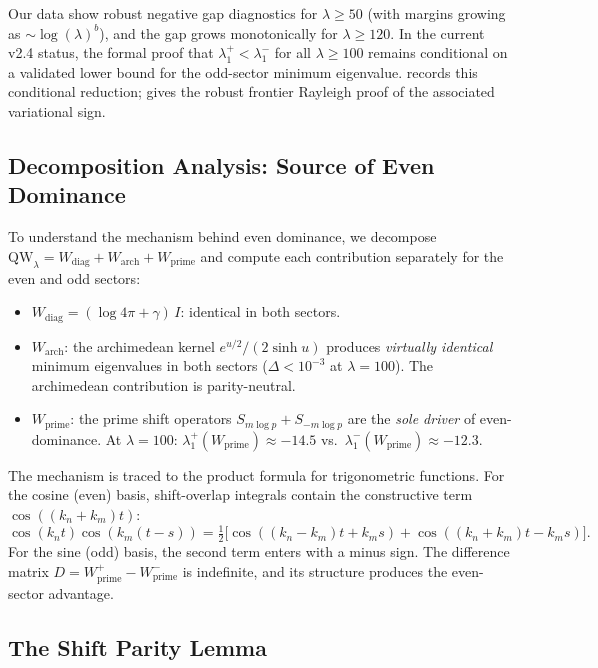 \documentclass[12pt,a4paper]{article}
\theoremstyle{definition}
\theoremstyle{remark}
\begin{document}
Our data show robust negative gap diagnostics for $\lambda \geq 50$ (with margins growing as $\sim \log(\lambda)^b$), and the gap grows monotonically for $\lambda \geq 120$. In the current v2.4 status, the formal proof that $\lambda_1^+ < \lambda_1^-$ for all $\lambda \geq 100$ remains conditional on a validated lower bound for the odd-sector minimum eigenvalue.  records this conditional reduction;  gives the robust frontier Rayleigh proof of the associated variational sign.

\subsection{Decomposition Analysis: Source of Even Dominance}

To understand the mechanism behind even dominance, we decompose $\mathrm{QW}_\lambda = W_{\mathrm{diag}} + W_{\mathrm{arch}} + W_{\mathrm{prime}}$ and compute each contribution separately for the even and odd sectors:

\begin{itemize}
  \item $W_{\mathrm{diag}} = (\log 4\pi + \gamma)\,I$: identical in both sectors.
  \item $W_{\mathrm{arch}}$: the archimedean kernel $e^{u/2}/(2\sinh u)$ produces \emph{virtually identical} minimum eigenvalues in both sectors ($\Delta < 10^{-3}$ at $\lambda = 100$). The archimedean contribution is parity-neutral.
  \item $W_{\mathrm{prime}}$: the prime shift operators $S_{m\log p} + S_{-m\log p}$ are the \emph{sole driver} of even-dominance. At $\lambda = 100$: $\lambda_1^+(W_{\mathrm{prime}}) \approx -14.5$ vs.\ $\lambda_1^-(W_{\mathrm{prime}}) \approx -12.3$.
\end{itemize}

The mechanism is traced to the product formula for trigonometric functions. For the cosine (even) basis, shift-overlap integrals contain the constructive term $\cos((k_n + k_m)t)$:
\[
  \cos(k_n t)\cos(k_m(t-s)) = \tfrac{1}{2}\bigl[\cos((k_n-k_m)t + k_m s) + \cos((k_n+k_m)t - k_m s)\bigr].
\]
For the sine (odd) basis, the second term enters with a minus sign. The difference matrix $D = W_{\mathrm{prime}}^+ - W_{\mathrm{prime}}^-$ is indefinite, and its structure produces the even-sector advantage.

\subsection{The Shift Parity Lemma}
\label{sec:shift-parity}
\end{document}

